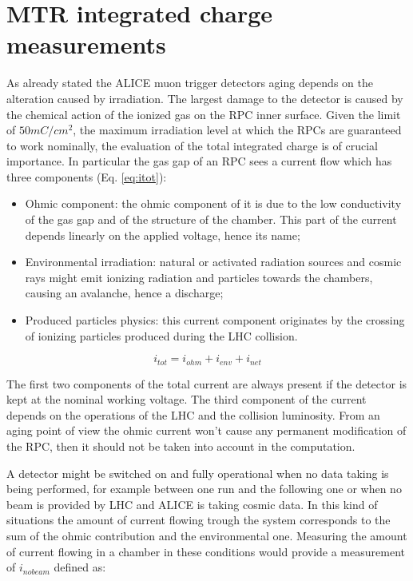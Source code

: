 \section{MTR integrated charge measurements}
\label{currents}
As already stated the ALICE muon trigger detectors aging depends on the alteration caused by irradiation.
The largest damage to the detector is caused by the chemical action of the ionized gas on the RPC inner surface.
Given the limit of $50mC/cm^2$, the maximum irradiation level at which the RPCs are guaranteed to work nominally, the evaluation of the total integrated charge is of crucial importance.
In particular the gas gap of an RPC sees a current flow which has three components (Eq. \ref{eq:itot}):
\begin{itemize}
\item Ohmic component: the ohmic component of it is due to the low conductivity of the gas gap and of the structure of the chamber. This part of the current depends linearly on the applied voltage, hence its name;
\item Environmental irradiation: natural or activated radiation sources and cosmic rays might emit ionizing radiation and particles towards the chambers, causing an avalanche, hence a discharge;
\item Produced particles physics: this current component originates by the crossing of ionizing particles produced during the LHC collision.
\end{itemize}

\begin{equation}
\label{eq:itot}
i_{tot}=i_{ohm}+i_{env}+i_{net}
\end{equation}

The first two components of the total current are always present if the detector is kept at the nominal working voltage.
The third component of the current depends on the operations of the LHC and the collision luminosity.
From an aging point of view the ohmic current won't cause any permanent modification of the RPC, then it should not be taken into account in the computation.

A detector might be switched on and fully operational when no data taking is being performed, for example between one run and the following one or when no beam is provided by LHC and ALICE is taking cosmic data.
In this kind of situations the amount of current flowing trough the system corresponds to the sum of the ohmic contribution and the environmental one.
Measuring the amount of current flowing in a chamber in these conditions would provide a measurement of $i_{no beam}$ defined as:

